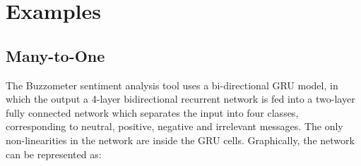 \documentclass[10pt]{amsart}
\theoremstyle{definition}
\begin{document}
%


\section{Examples}

\subsection{Many-to-One}

The Buzzometer sentiment analysis tool uses a bi-directional GRU model, in which the output a 4-layer
bidirectional recurrent network is fed into a two-layer fully connected network which separates the input into
four classes, corresponding to neutral, positive, negative and irrelevant messages. The only non-linearities
 in the network are inside the GRU cells.  Graphically, the network can be represented as:
\end{document}
